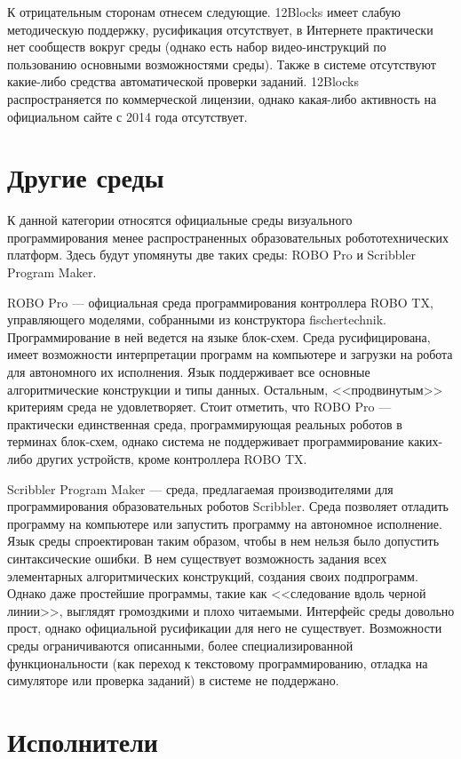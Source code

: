\documentclass[a5paper]{article}
\begin{document}
К отрицательным сторонам отнесем следующие.  12Blocks имеет слабую методическую поддержку, русификация 
отсутствует, в Интернете практически нет сообществ вокруг среды (однако есть набор видео-инструкций по пользованию 
основными возможностями среды). Также в системе отсутствуют какие-либо средства автоматической проверки заданий. 
12Blocks распространяется по коммерческой лицензии, однако какая-либо активность на официальном сайте 
с 2014 года отсутствует.

\section{Другие среды}

К данной категории относятся официальные среды визуального программирования менее распространенных образовательных 
робототехнических платформ. Здесь будут упомянуты две таких среды: ROBO Pro и Scribbler Program Maker.

ROBO Pro --- официальная среда программирования контроллера ROBO TX, управляющего моделями, собранными из 
конструктора fischertechnik. Программирование в ней ведется на языке блок-схем. Среда русифицирована, имеет 
возможности интерпретации программ на компьютере и загрузки на робота для автономного их исполнения. Язык поддерживает 
все основные алгоритмические конструкции и типы данных. Остальным, <<продвинутым>> критериям среда не удовлетворяет. 
Стоит отметить, что ROBO Pro --- практически единственная среда, программирующая реальных роботов в терминах 
блок-схем, однако система не поддерживает программирование каких-либо других устройств, кроме контроллера ROBO TX.

Scribbler Program Maker --- среда, предлагаемая производителями для программирования образовательных роботов 
Scribbler. Среда позволяет отладить программу на компьютере или запустить программу на автономное исполнение. 
Язык среды спроектирован таким образом, чтобы в нем нельзя было допустить синтаксические ошибки. В нем существует 
возможность задания всех элементарных алгоритмических конструкций, создания своих подпрограмм. Однако даже простейшие 
программы, такие как <<следование вдоль черной линии>>, выглядят громоздкими и плохо читаемыми. Интерфейс среды 
довольно прост, однако официальной русификации для него не существует. Возможности среды ограничиваются 
описанными, более специализированной функциональности (как переход к текстовому программированию, отладка на 
симуляторе или проверка заданий) в системе не поддержано.

\section{Исполнители}
\end{document}

